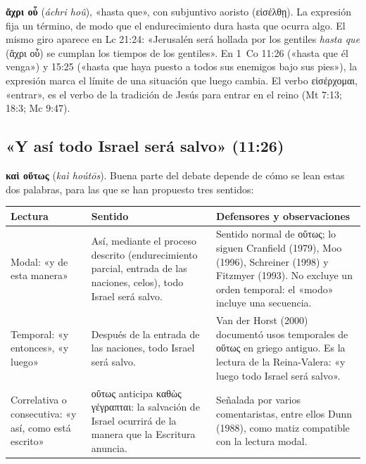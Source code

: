 \documentclass[11pt,letterpaper]{article}
\newcommand{\grc}[1]{\foreignlanguage{ancientgreek}{#1}}
\begin{document}
\textbf{\grc{ἄχρι οὗ}} (\emph{áchri hoû}), «hasta que», con subjuntivo aoristo (\grc{εἰσέλθῃ}). La expresión fija un término, de modo que el endurecimiento dura hasta que ocurra algo. El mismo giro aparece en Lc 21:24: «Jerusalén será hollada por los gentiles \emph{hasta que} (\grc{ἄχρι οὗ}) se cumplan los tiempos de los gentiles». En 1~Co 11:26 («hasta que él venga») y 15:25 («hasta que haya puesto a todos sus enemigos bajo sus pies»), la expresión marca el límite de una situación que luego cambia. El verbo \grc{εἰσέρχομαι}, «entrar», es el verbo de la tradición de Jesús para entrar en el reino (Mt 7:13; 18:3; Mc 9:47).

\subsection{«Y así todo Israel será salvo» (11:26)}

\textbf{\grc{καὶ οὕτως}} (\emph{kaì hoútōs}). Buena parte del debate depende de cómo se lean estas dos palabras, para las que se han propuesto tres sentidos:

\begin{center}\small
\renewcommand{\arraystretch}{1.3}
\begin{tabular}{>{\RaggedRight\arraybackslash}p{2.8cm}>{\RaggedRight\arraybackslash}p{5.4cm}>{\RaggedRight\arraybackslash}p{5.6cm}}
\toprule
\textbf{Lectura} & \textbf{Sentido} & \textbf{Defensores y observaciones}\\
\midrule
Modal: «y de esta manera» & Así, mediante el proceso descrito (endurecimiento parcial, entrada de las naciones, celos), todo Israel será salvo. & Sentido normal de \grc{οὕτως}; lo siguen Cranfield (1979), Moo (1996), Schreiner (1998) y Fitzmyer (1993). No excluye un orden temporal: el «modo» incluye una secuencia.\\
Temporal: «y entonces», «y luego» & Después de la entrada de las naciones, todo Israel será salvo. & Van der Horst (2000) documentó usos temporales de \grc{οὕτως} en griego antiguo. Es la lectura de la Reina-Valera: «y luego todo Israel será salvo».\\
Correlativa o consecutiva: «y así, como está escrito» & \grc{οὕτως} anticipa \grc{καθὼς γέγραπται}: la salvación de Israel ocurrirá de la manera que la Escritura anuncia. & Señalada por varios comentaristas, entre ellos Dunn (1988), como matiz compatible con la lectura modal.\\
\bottomrule
\end{tabular}\end{center}
\end{document}
